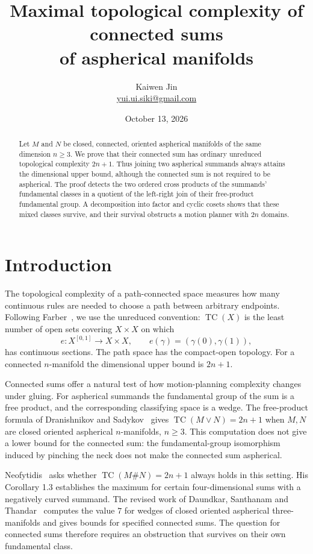 \documentclass[11pt]{article}
\title{Maximal topological complexity of connected sums\\of aspherical manifolds}
\author{Kaiwen Jin\\\small\href{mailto:yui.ui.siki@gmail.com}{yui.ui.siki@gmail.com}}
\date{October 13, 2026}
\theoremstyle{remark}
\newcommand{\TC}{\operatorname{TC}}
\begin{document}
\maketitle

\begin{abstract}
Let \(M\) and \(N\) be closed, connected, oriented aspherical manifolds of the
same dimension \(n\geq 3\). We prove that their connected sum has ordinary
unreduced topological complexity \(2n+1\). Thus joining two aspherical
summands always attains the dimensional upper bound, although the connected
sum is not required to be aspherical. The proof detects the two ordered
cross products of the summands' fundamental classes in a quotient of the
left-right join of their free-product fundamental group. A decomposition
into factor and cyclic cosets shows that these mixed classes survive, and
their survival obstructs a motion planner with \(2n\) domains.
\end{abstract}

\section{Introduction}

The topological complexity of a path-connected space measures how many
continuous rules are needed to choose a path between arbitrary endpoints.
Following Farber~\cite{Farber}, we use the unreduced convention: \(\TC(X)\)
is the least number of open sets covering \(X\times X\) on which
\[
 e:X^{[0,1]}\longrightarrow X\times X,\qquad
 e(\gamma)=(\gamma(0),\gamma(1)),
\]
has continuous sections. The path space has the compact-open topology.
For a connected \(n\)-manifold the dimensional upper bound is \(2n+1\).

Connected sums offer a natural test of how motion-planning complexity
changes under gluing. For aspherical summands the fundamental group of the
sum is a free product, and the corresponding classifying space is a wedge.
The free-product formula of Dranishnikov and Sadykov~\cite{DSfree} gives
\(\TC(M\vee N)=2n+1\) when \(M,N\) are closed oriented aspherical
\(n\)-manifolds, \(n\geq3\). This computation does not give a lower bound
for the connected sum: the fundamental-group isomorphism induced by
pinching the neck does not make the connected sum aspherical.

Neofytidis~\cite[Question 5.5(b)]{Neofytidis} asks whether
\(\TC(M\#N)=2n+1\) always holds in this setting. His Corollary 1.3
establishes the maximum for certain four-dimensional sums with a negatively
curved summand. The revised work of Daundkar, Santhanam and
Thandar~\cite[Proposition 5.3]{DST} computes the value \(7\) for wedges
of closed oriented aspherical three-manifolds and gives bounds for
specified connected sums. The question for connected sums therefore
requires an obstruction that survives on their own fundamental class.
\end{document}
